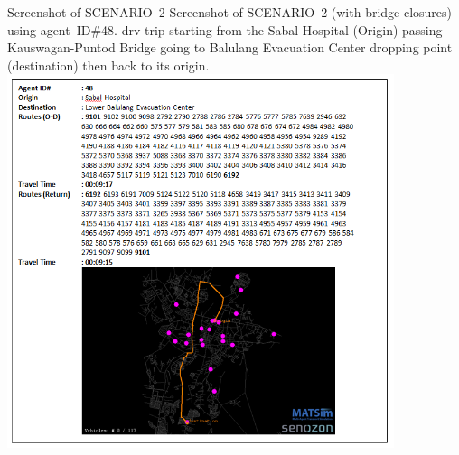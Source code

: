 \createfigure%
{Screenshot of SCENARIO~2}%
{Screenshot of SCENARIO~2 (with bridge closures) using agent~ID\#48. \protect\gls{drv} trip starting from the Sabal Hospital (Origin) passing Kauswagan-Puntod Bridge going to Balulang Evacuation Center dropping point (destination) then back to its origin.}%
{\label{fig:philippines_fig5}}%
{\includegraphics[width=0.85\textwidth, angle=0]{./scenarios/figures/philippines_fig5.png}}%
{}







 
